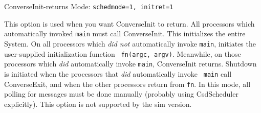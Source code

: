 ConverseInit-returns Mode: {\tt schedmode=1, initret=1}

This option is used when you want ConverseInit to return.  All
processors which automatically invoked {\tt main} must call
ConverseInit.  This initializes the entire \converse{} System.  On all
processors which {\em did not} automatically invoke {\tt main},
\converse{} initiates the user-supplied initialization function {\tt
fn(argc, argv)}.  Meanwhile, on those processors which {\em did}
automatically invoke {\tt main}, ConverseInit returns.  Shutdown is
initiated when the processors that {\em did} automatically invoke {\tt
main} call ConverseExit, and when the other processors return from
{\tt fn}.  In this mode, all polling for messages must be done
manually (probably using CsdScheduler explicitly).  This option is not
supported by the sim version.


